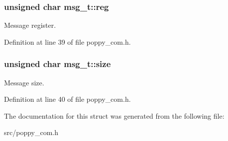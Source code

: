 \hypertarget{structmsg__t_a0aef01fbaf575c639d82d5beee92c421}{
\subsubsection[{reg}]{\setlength{\rightskip}{0pt plus 5cm}unsigned char msg\-\_\-t\-::reg}}\label{structmsg__t_a0aef01fbaf575c639d82d5beee92c421}
Message register. 

Definition at line 39 of file poppy\-\_\-com.\-h.

\hypertarget{structmsg__t_a3736f2ca203e665223b225ca07def9b5}{
\subsubsection[{size}]{\setlength{\rightskip}{0pt plus 5cm}unsigned char msg\-\_\-t\-::size}}\label{structmsg__t_a3736f2ca203e665223b225ca07def9b5}
Message size. 

Definition at line 40 of file poppy\-\_\-com.\-h.



The documentation for this struct was generated from the following file\-:\begin{DoxyCompactItemize}
\item 
src/poppy\-\_\-com.\-h\end{DoxyCompactItemize}
